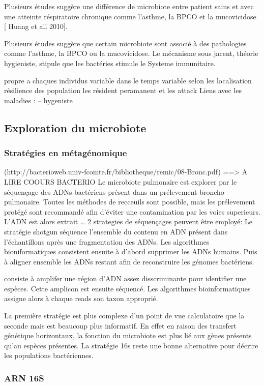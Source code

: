 \documentclass[12pt,a4paper]{article}
\begin{document}
Plusieurs études suggère une différence de microbiote entre patient sains et avec une atteinte réspiratoire chronique comme l’asthme, la BPCO et la mucovicidose [ Huang et all 2010].

Plusieurs études suggère que certain microbiote sont associé à des pathologies comme l’asthme, la BPCO ou la mucovicidose. Le mécanisme sous jacent, théorie hygieniste, stipule que les bactéries stimule le Systeme immunitaire.

propre a chaques individus
variable dans le temps
variable selon les localisation
résilience des population
les résident peramanent et les attack
Liens avec les maladies :
– hygeniste

\subsection{Exploration du microbiote}
\subsubsection{Stratégies en métagénomique}
(http://bacterioweb.univ-fcomte.fr/bibliotheque/remic/08-Bronc.pdf) ==> A LIRE COOURS BACTERIO
Le microbiote pulmonaire est explorer par le séquençage des ADNs bactériens présent dans un prélevement broncho-pulmonaire. Toutes les méthodes de recceuils sont possible, mais les prélevement protégé sont recommandé afin d’éviter une contamination par les voies superieurs.
L’ADN est alors extrait …
2 strategies de séquençages peuvent être employé:
Le stratégie shotgun séquence l’ensemble du contenu en ADN présent dans l’échantillons après une fragmentation des ADNs. Les algorithmes bioniformatiques consistent ensuite à d’abord supprimer les ADNs humains. Puis à aligner ensemble les ADNs restant afin de reconstruire les génomes bactériens.

consiste à amplifer une région d’ADN assez disscriminante pour identifier une espèces. Cette amplicon est ensuite séquencé. Les algorithmes bioinformatiques assigne alors à chaque reads son taxon approprié.

La première stratégie est plus complexe d’un point de vue calculatoire que la seconde mais est beaucoup plus informatif. En effet en raison des transfert génétique horizontaux, la fonction du microbiote est plus lié aux gènes présents qu’au espèces présentes.
La stratégie 16s reste une bonne alternative pour décrire les populations bactériennes.

\subsubsection{ARN 16S}
\end{document}
